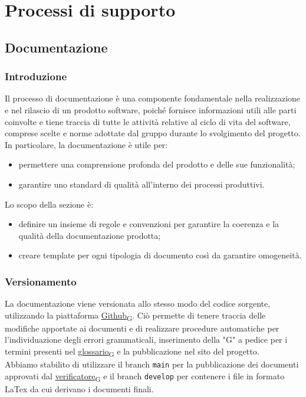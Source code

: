 \section{Processi di supporto}
\subsection{Documentazione}
\subsubsection{Introduzione}
Il processo di documentazione è una componente fondamentale nella realizzazione e nel rilascio di un prodotto software,
poiché fornisce informazioni utili alle parti coinvolte e tiene traccia di tutte le attività relative al ciclo di vita del software,
comprese scelte e norme adottate dal gruppo durante lo svolgimento del progetto. In particolare, la documentazione è utile per:
\begin{itemize}
	\item permettere una comprensione profonda del prodotto e delle sue funzionalità;
	\item garantire uno standard di qualità all'interno dei processi produttivi.
\end{itemize}
Lo scopo della sezione è:
\begin{itemize}
	\item definire un insieme di regole e convenzioni per garantire la coerenza e la qualità della documentazione prodotta;
	\item creare template per ogni tipologia di documento così da garantire omogeneità.
\end{itemize}

\subsubsection{Versionamento}
La documentazione viene versionata allo stesso modo del codice sorgente, utilizzando la piattaforma \href{https://7last.github.io/docs/pb/documentazione-interna/glossario\#github}{Github\textsubscript{G}}.
Ciò permette di tenere traccia delle modifiche apportate ai documenti e di realizzare procedure automatiche per l'individuazione degli errori grammaticali,
inserimento della "G" a pedice per i termini presenti nel \href{https://7last.github.io/docs/pb/documentazione-interna/glossario\#glossario}{glossario\textsubscript{G}} e la pubblicazione nel sito del progetto.\\
Abbiamo stabilito di utilizzare il branch \texttt{main} per la pubblicazione dei documenti approvati dal \href{https://7last.github.io/docs/pb/documentazione-interna/glossario\#verificatore}{verificatore\textsubscript{G}} e il branch \texttt{develop} per contenere
i file in formato LaTex da cui derivano i documenti finali.

